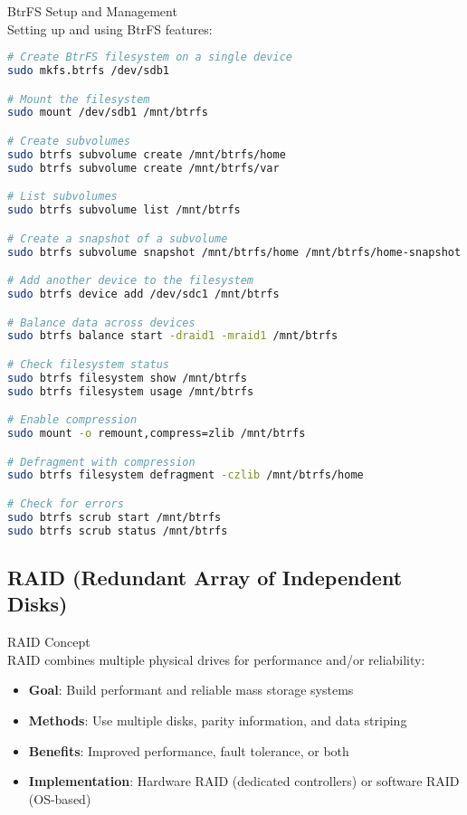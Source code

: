 \begin{example2}{BtrFS Setup and Management}\\
    Setting up and using BtrFS features:
    
\begin{lstlisting}[language=bash, style=basesmol]
# Create BtrFS filesystem on a single device
sudo mkfs.btrfs /dev/sdb1

# Mount the filesystem
sudo mount /dev/sdb1 /mnt/btrfs

# Create subvolumes
sudo btrfs subvolume create /mnt/btrfs/home
sudo btrfs subvolume create /mnt/btrfs/var

# List subvolumes
sudo btrfs subvolume list /mnt/btrfs

# Create a snapshot of a subvolume
sudo btrfs subvolume snapshot /mnt/btrfs/home /mnt/btrfs/home-snapshot

# Add another device to the filesystem
sudo btrfs device add /dev/sdc1 /mnt/btrfs

# Balance data across devices
sudo btrfs balance start -draid1 -mraid1 /mnt/btrfs

# Check filesystem status
sudo btrfs filesystem show /mnt/btrfs
sudo btrfs filesystem usage /mnt/btrfs

# Enable compression
sudo mount -o remount,compress=zlib /mnt/btrfs

# Defragment with compression
sudo btrfs filesystem defragment -czlib /mnt/btrfs/home

# Check for errors
sudo btrfs scrub start /mnt/btrfs
sudo btrfs scrub status /mnt/btrfs
\end{lstlisting}
\end{example2}

\subsection{RAID (Redundant Array of Independent Disks)}

\begin{definition}{RAID Concept}\\
    RAID combines multiple physical drives for performance and/or reliability:
    \begin{itemize}
        \item \textbf{Goal}: Build performant and reliable mass storage systems
        \item \textbf{Methods}: Use multiple disks, parity information, and data striping
        \item \textbf{Benefits}: Improved performance, fault tolerance, or both
        \item \textbf{Implementation}: Hardware RAID (dedicated controllers) or software RAID (OS-based)
    \end{itemize}
\end{definition}

